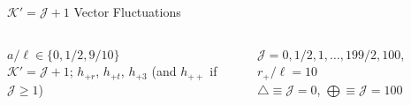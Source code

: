 \documentclass[aspectratio=169, xcolor=dvipsnames]{beamer}
\begin{document}
\begin{frame}{\(\mathcal K' = \mathcal J + 1\) Vector Fluctuations}
  \vfill

  \begin{columns}[c]
    \begin{column}{0.5\textwidth}
      \(a/\ell \in \{0, 1/2, 9/10\}\)\\
      \(\mathcal K' = \mathcal J + 1\); \(h_{+r}\), \(h_{+t}\), \(h_{+3}\) 
      (and \(h_{++}\) if \(\mathcal J \geq 1\))
    \end{column}

    \begin{column}{0.5\textwidth}
      \(\mathcal J = 0, 1/2, 1, \ldots, 199/2, 100\), \(r_+/\ell = 10\)\\
      \(\bigtriangleup \equiv \mathcal J = 0\),
      \(\bigoplus \equiv \mathcal J = 100\)
    \end{column}
  \end{columns}
\end{frame}
\end{document}
